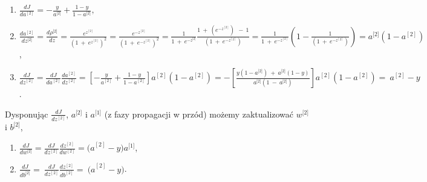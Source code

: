 \begin{enumerate}
\def\labelenumi{\arabic{enumi}.}
\item
  \(\frac{dJ}{da^{\left\lbrack 2 \right\rbrack}} = - \frac{y}{a^{\lbrack 2\rbrack}} + \frac{1 - y}{1 - a^{\lbrack 2\rbrack}},\)
\item
    \(\frac{da^{\left\lbrack 2 \right\rbrack}}{dz^{\lbrack 2\rbrack}} = \frac{d\rho^{\lbrack 2\rbrack}}{dz} = \frac{e^{z^{\left\lbrack 2 \right\rbrack}}}{\left( 1\  + {\ e}^{z^{\left\lbrack 2 \right\rbrack}} \right)^{2}} = \frac{e^{-z^{\left\lbrack 2 \right\rbrack}}}{\left( 1\  + {\ e}^{-z^{\left\lbrack 2 \right\rbrack}} \right)^{2}} = \frac{1}{1\  + {\ e}^{- z^{\lbrack 2\rbrack}}} \frac{1\  + \ \left( e^{- z^{\left\lbrack 2 \right\rbrack}} \right)\ \  - \ 1}{\left( 1\  + {\ e}^{- z^{\left\lbrack 2 \right\rbrack}} \right)} = \frac{1}{1\  + {\ e}^{- z^{\left\lbrack 2 \right\rbrack}}} (1 - \frac{1}{\left( 1\  + {\ e}^{- z^{\left\lbrack 2 \right\rbrack}} \right)}) = a^{\lbrack 2\rbrack}(1 - a^{\left\lbrack 2 \right\rbrack})\),
\item
  \(\frac{dJ}{dz^{\left\lbrack 2 \right\rbrack}} = \frac{dJ}{da^{\left\lbrack 2 \right\rbrack}} \frac{da^{\left\lbrack 2 \right\rbrack}}
  {dz^{\left\lbrack 2 \right\rbrack}} = \left\lbrack - \frac{y}{a^{\left\lbrack 2 \right\rbrack}} + \frac{1 - y}{1 - a^{\left\lbrack 2 \right\rbrack}}
  \right\rbrack a^{\left\lbrack 2 \right\rbrack}\left( 1 - a^{\left\lbrack 2 \right\rbrack} \right) = - \left\lbrack \frac{y\left( 1 - a^{\lbrack 2\rbrack} \right)\  + \ a^{\lbrack 2\rbrack}
  \left( 1 - y \right)}{a^{\lbrack 2\rbrack}\left( 1\ -\ a^{\lbrack 2\rbrack} \right)} \right\rbrack a^{\left\lbrack 2 \right\rbrack}
  \left( 1 - a^{\left\lbrack 2 \right\rbrack} \right) = \ a^{\left\lbrack 2 \right\rbrack} - y\).
\end{enumerate}

Dysponując \(\frac{dJ}{dz^{\left\lbrack 2 \right\rbrack}}\),
\(a^{\lbrack 2\rbrack}\) i \(a^{\lbrack 1\rbrack}\) (z fazy propagacji
w przód) możemy zaktualizować \(w^{\lbrack 2\rbrack}\) i
\(b^{\lbrack 2\rbrack}\),

\begin{enumerate}
\def\labelenumi{\arabic{enumi}.}
\setcounter{enumi}{3}
\item
  \(\frac{dJ}{dw^{\lbrack 2\rbrack}} = \frac{dJ}{dz^{\left\lbrack 2 \right\rbrack}} \frac{dz^{\left\lbrack 2 \right\rbrack}}{dw^{\left\lbrack 2 \right\rbrack}} = {(a}^{\left\lbrack 2 \right\rbrack} - y)a^{\lbrack 1\rbrack}\),
\item
  \(\frac{dJ}{db^{\lbrack 2\rbrack}} = \ \frac{dJ}{dz^{\left\lbrack 2 \right\rbrack}} \frac{dz^{\left\lbrack 2 \right\rbrack}}{db^{\left\lbrack 2 \right\rbrack}} = \ {(a}^{\left\lbrack 2 \right\rbrack} - y)\).
\end{enumerate}

